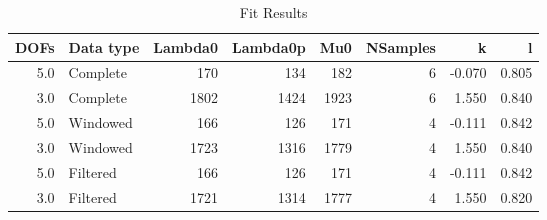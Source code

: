 \begin{table}
\centering
\caption{Fit Results}
\begin{tabular}{rlrrrrrr}
\toprule
 DOFs & Data type &  Lambda0 &  Lambda0p &   Mu0 &  NSamples &      k &      l \\
\midrule
  5.0 &  Complete &      170 &       134 &   182 &         6 & -0.070 &  0.805 \\
  3.0 &  Complete &     1802 &      1424 &  1923 &         6 &  1.550 &  0.840 \\
  5.0 &  Windowed &      166 &       126 &   171 &         4 & -0.111 &  0.842 \\
  3.0 &  Windowed &     1723 &      1316 &  1779 &         4 &  1.550 &  0.840 \\
  5.0 &  Filtered &      166 &       126 &   171 &         4 & -0.111 &  0.842 \\
  3.0 &  Filtered &     1721 &      1314 &  1777 &         4 &  1.550 &  0.820 \\
\bottomrule
\end{tabular}
\end{table}
